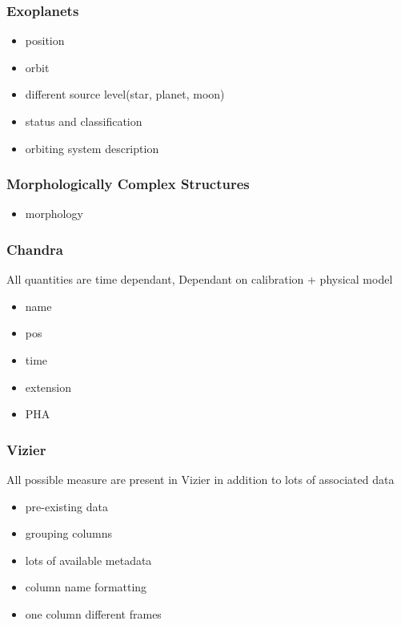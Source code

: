\documentclass[11pt,a4paper]{ivoa}
\begin{document}
\subsubsection{Exoplanets}
\begin{itemize}
    \item position
    \item orbit
    \item different source level(star, planet, moon)
    \item status and classification
    \item orbiting system description
\end{itemize}

\subsubsection{Morphologically Complex Structures}
\begin{itemize}    
    \item morphology
\end{itemize}

\subsubsection{Chandra} 
All quantities are time dependant,
Dependant on calibration + physical
model
\begin{itemize}    
    \item name
    \item pos
    \item time
    \item extension
    \item PHA 
\end{itemize}

\subsubsection{Vizier} 
All possible measure are present in Vizier in addition to lots of associated data 
\begin{itemize}    
    \item pre-existing data
    \item grouping columns
    \item lots of available metadata
    \item column name formatting
    \item one column different frames
\end{itemize}
\end{document}
